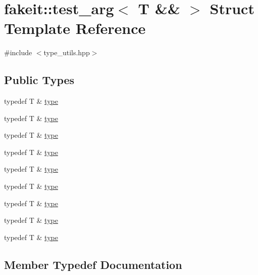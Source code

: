 \hypertarget{structfakeit_1_1test__arg_3_01T_01_6_6_01_4}{}\section{fakeit\+::test\+\_\+arg$<$ T \&\& $>$ Struct Template Reference}
\label{structfakeit_1_1test__arg_3_01T_01_6_6_01_4}


{\ttfamily \#include $<$type\+\_\+utils.\+hpp$>$}

\subsection*{Public Types}
\begin{DoxyCompactItemize}
\item 
typedef T \& \mbox{\hyperlink{structfakeit_1_1test__arg_3_01T_01_6_6_01_4_aaace2782c3dd97bd31e137f8c7c47f5f}{type}}
\item 
typedef T \& \mbox{\hyperlink{structfakeit_1_1test__arg_3_01T_01_6_6_01_4_aaace2782c3dd97bd31e137f8c7c47f5f}{type}}
\item 
typedef T \& \mbox{\hyperlink{structfakeit_1_1test__arg_3_01T_01_6_6_01_4_aaace2782c3dd97bd31e137f8c7c47f5f}{type}}
\item 
typedef T \& \mbox{\hyperlink{structfakeit_1_1test__arg_3_01T_01_6_6_01_4_aaace2782c3dd97bd31e137f8c7c47f5f}{type}}
\item 
typedef T \& \mbox{\hyperlink{structfakeit_1_1test__arg_3_01T_01_6_6_01_4_aaace2782c3dd97bd31e137f8c7c47f5f}{type}}
\item 
typedef T \& \mbox{\hyperlink{structfakeit_1_1test__arg_3_01T_01_6_6_01_4_aaace2782c3dd97bd31e137f8c7c47f5f}{type}}
\item 
typedef T \& \mbox{\hyperlink{structfakeit_1_1test__arg_3_01T_01_6_6_01_4_aaace2782c3dd97bd31e137f8c7c47f5f}{type}}
\item 
typedef T \& \mbox{\hyperlink{structfakeit_1_1test__arg_3_01T_01_6_6_01_4_aaace2782c3dd97bd31e137f8c7c47f5f}{type}}
\item 
typedef T \& \mbox{\hyperlink{structfakeit_1_1test__arg_3_01T_01_6_6_01_4_aaace2782c3dd97bd31e137f8c7c47f5f}{type}}
\end{DoxyCompactItemize}


\subsection{Member Typedef Documentation}
\mbox{\label{structfakeit_1_1test__arg_3_01T_01_6_6_01_4_aaace2782c3dd97bd31e137f8c7c47f5f}} 
